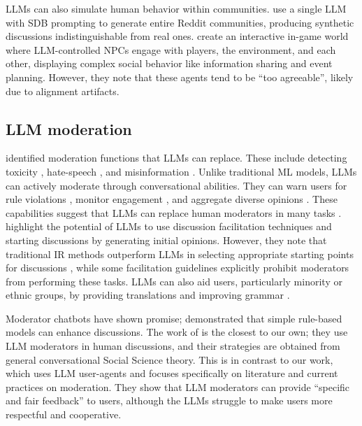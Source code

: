\acp{LLM} can also simulate human behavior within communities. \citet{park_simulacra} use a single \ac{LLM} with \ac{SDB} prompting to generate entire Reddit communities, producing synthetic discussions indistinguishable from real ones. \citet{Park2023GenerativeAI} create an interactive in-game world where \ac{LLM}-controlled \acp{NPC} engage with players, the environment, and each other, displaying complex social behavior like information sharing and event planning. However, they note that these agents tend to be “too agreeable”, likely due to alignment artifacts.


\subsection{LLM moderation}

\citet{korre2025evaluation} identified moderation functions that \acp{LLM} can replace. These include detecting toxicity \cite{kang-qian-2024-implanting, Wang2022ToxicityDW}, hate-speech \cite{Nirmal2024TowardsIH, shi-2024-hatespeech}, and misinformation \cite{Liu2024DetectIJ, Xu2024ACS}. Unlike traditional \ac{ML} models, \acp{LLM} can actively moderate through conversational abilities. They can warn users for rule violations \cite{Kumar_AbuHashem_Durumeric_2024}, monitor engagement \cite{schroeder-etal-2024-fora}, and aggregate diverse opinions \cite{small-polis-llm}. These capabilities suggest that \acp{LLM} can replace human moderators in many tasks \cite{small-polis-llm, seering_self_moderation}.  \citet{small-polis-llm} highlight the potential of \acp{LLM} to use discussion facilitation techniques and starting discussions by generating initial opinions. However, they note that traditional \ac{IR} methods outperform \acp{LLM} in selecting appropriate starting points for discussions \cite{karadzhov2023delidata}, while some facilitation guidelines \cite{dimitra-book} explicitly prohibit moderators from performing these tasks. \acp{LLM} can also aid users, particularly minority or ethnic groups, by providing translations and improving grammar \cite{Tsai2024Generative}. 

Moderator chatbots have shown promise; \citet{kim_et_al_chatbot} demonstrated that simple rule-based models can enhance discussions. The work of \citet{cho-etal-2024-language} 
is the closest to our own; they use \ac{LLM} moderators in human discussions, and their strategies are obtained from general conversational Social Science theory. This is in contrast to our work, which uses \ac{LLM} user-agents and focuses specifically on literature and current practices on moderation. They show that \ac{LLM} moderators can provide “specific and fair feedback” to users, although the \acp{LLM} struggle to make users more respectful and cooperative.